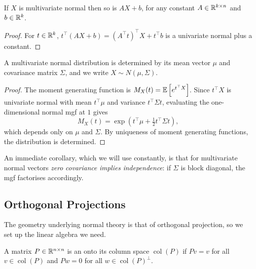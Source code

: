 \documentclass[a4paper]{scrartcl}
\newcommand{\col}{\operatorname{col}}
\begin{document}
\begin{proposition}
  If $X$ is multivariate normal then so is $AX + b$, for any constant $A \in \mathbb{R}^{k\times n}$ and $b \in \mathbb{R}^k$.
\end{proposition}
\begin{proof}
  For $t \in \mathbb{R}^k$, $t^\top(AX+b) = (A^\top t)^\top X + t^\top b$ is a univariate normal plus a constant.
\end{proof}

\begin{proposition}
  A multivariate normal distribution is determined by its mean vector $\mu$ and covariance matrix $\Sigma$, and we write $X \sim N(\mu,\Sigma)$.
\end{proposition}
\begin{proof}
  The moment generating function is $M_X(t) = \mathbb{E}\left[e^{t^\top X}\right]$. Since $t^\top X$ is univariate normal with mean $t^\top\mu$ and variance $t^\top\Sigma t$, evaluating the one-dimensional normal mgf at $1$ gives
  $$
  M_X(t) = \exp\left(t^\top\mu + \tfrac{1}{2}t^\top\Sigma t\right),
  $$
  which depends only on $\mu$ and $\Sigma$. By uniqueness of moment generating functions, the distribution is determined.
\end{proof}

An immediate corollary, which we will use constantly, is that for multivariate normal vectors \emph{zero covariance implies independence}: if $\Sigma$ is block diagonal, the mgf factorises accordingly.

\subsection{Orthogonal Projections}

The geometry underlying normal theory is that of orthogonal projection, so we set up the linear algebra we need.

\begin{definition}
  A matrix $P \in \mathbb{R}^{n\times n}$ is an  onto its column space $\col(P)$ if $Pv = v$ for all $v \in \col(P)$ and $Pw = 0$ for all $w \in \col(P)^\perp$.
\end{definition}
\end{document}
